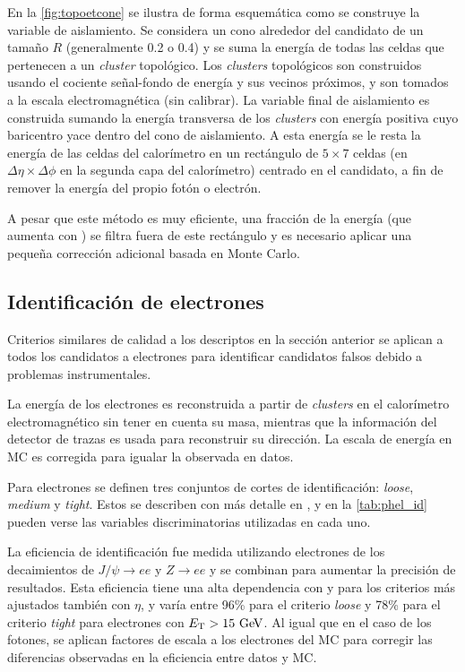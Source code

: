 En la \cref{fig:topoetcone} se ilustra de forma esquemática como se construye
la variable de aislamiento. Se considera un cono alrededor del candidato
de un tamaño $R$ (generalmente 0.2 o 0.4) y se suma la energía de todas las
celdas que pertenecen a un \emph{cluster} topológico. Los \emph{clusters} topológicos son
construidos usando el cociente señal-fondo de energía y sus vecinos próximos,
y son tomados a la escala electromagnética (sin calibrar). La variable final de
aislamiento es construida sumando la energía transversa de los \emph{clusters} con
energía positiva cuyo baricentro yace dentro del cono de aislamiento. A esta
energía se le resta la energía de las celdas del calorímetro en un rectángulo de
$5\times 7$ celdas (en $\Delta\eta \times \Delta\phi$ en la segunda capa del
calorímetro) centrado en el candidato, a fin de remover la energía del propio
fotón o electrón.

A pesar que este método es muy eficiente, una fracción de la energía (que aumenta con {\pt}) se filtra fuera de
este rectángulo y es necesario aplicar una peque\~na corrección adicional
basada en Monte Carlo.


\subsection{Identificación de electrones}
\label{sec:elec_obj}

Criterios similares de calidad a los descriptos en la sección anterior
se aplican a todos los candidatos a electrones para identificar candidatos
falsos debido a problemas instrumentales.

La energía de los electrones es reconstruida a partir de \emph{clusters} en el calorímetro
electromagnético sin tener en cuenta su masa, mientras que la información del
detector de trazas es usada para reconstruir su dirección. La escala de energía
en MC es corregida para igualar la observada en datos.

Para electrones se definen tres conjuntos de cortes de identificación: \emph{loose}, \emph{medium} y
\emph{tight}. Estos se describen con más detalle en \cite{ATL-PHYS-PUB-2011-007}, y
en la \cref{tab:phel_id} pueden verse las variables discriminatorias utilizadas
en cada uno.

La eficiencia de identificación fue medida utilizando electrones de los
decaimientos de $J/\psi\to ee$ y $Z\to ee$ y se combinan para aumentar la
precisión de resultados. Esta eficiencia tiene una alta dependencia con {\et} y para
los criterios más ajustados también con $\eta$, y varía entre 96\% para el criterio
\emph{loose} y 78\% para el criterio \emph{tight} para electrones con $\et>15\gev$.
Al igual que en el caso de los fotones, se aplican factores de escala
a los electrones del MC para corregir las diferencias observadas en la
eficiencia entre datos y MC.


